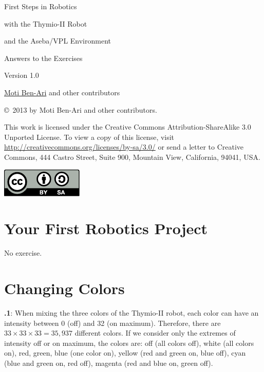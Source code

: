\documentclass[12pt,a4paper,english]{article}
\begin{document}
\thispagestyle{empty}

\begin{center}
\begin{bfseries}

\begin{Large}
First Steps in Robotics

with the
Thymio-II Robot

and the
Aseba/VPL Environment

\bigskip

Answers to the Exercises

\end{Large}

Version 1.0

\bigskip

\href{http://www.weizmann.ac.il/sci-tea/benari/}{Moti Ben-Ari} and other contributors

\end{bfseries}
\end{center}

\bigskip

\copyright{}\  2013 by Moti Ben-Ari and other contributors.

This work is licensed under the Creative Commons
Attribution-ShareAlike 3.0 Unported License. To view a copy
of this license, visit
\url{http://creativecommons.org/licenses/by-sa/3.0/}
or send a letter to Creative Commons, 444 Castro Street, Suite 900,
Mountain View, California, 94041, USA.

\begin{center}
\hspace{6pt}\includegraphics[width=.2\textwidth]{../images/by-sa}
\end{center}

\section{Your First Robotics Project}

No exercise.

\section{Changing Colors}

\textbf{\thesection.1}: 
When mixing the three colors of the Thymio-II robot, each color can have
an intensity between 0 (off) and 32 (on maximum). Therefore, there are
$33 \times 33 \times 33=35,937$ different colors. If we consider only
the extremes of intensity off or on maximum, the colors are: off (all
colors off), white (all colors on), red, green, blue (one color on),
yellow (red and green on, blue off), cyan (blue and green on, red off),
magenta (red and blue on, green off).
\end{document}

